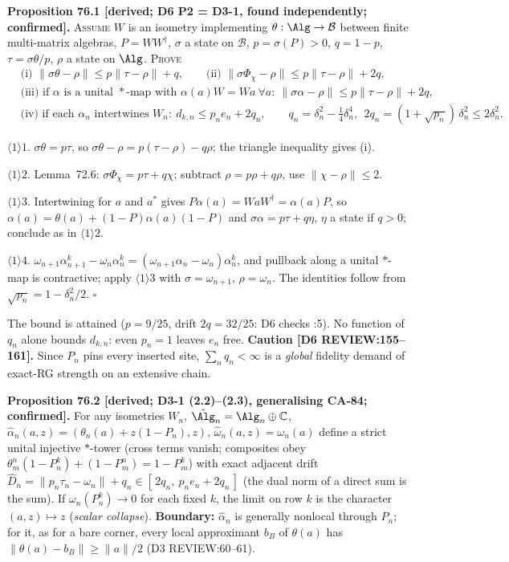 \textbf{Proposition 76.1 [derived; D6 P2 = D3-1, found independently; confirmed].}  \textsc{Assume} \(W\) is an isometry
implementing \(\theta:\Alg\to\mathcal B\) between finite multi-matrix algebras, \(P=WW^\dagger\), \(\sigma\) a state on
\(\mathcal B\), \(p=\sigma(P)>0\), \(q=1-p\), \(\tau=\sigma\theta/p\), \(\rho\) a state on \(\Alg\).  \textsc{Prove}
\begin{align*}
 &\text{(i) } \|\sigma\theta-\rho\|\le p\|\tau-\rho\|+q, \qquad
  \text{(ii) } \|\sigma\Phi_\chi-\rho\|\le p\|\tau-\rho\|+2q,\\
 &\text{(iii) if } \alpha \text{ is a unital } *\text{-map with } \alpha(a)W=Wa\ \forall a:\
  \|\sigma\alpha-\rho\|\le p\|\tau-\rho\|+2q,\\
 &\text{(iv) if each } \alpha_n \text{ intertwines } W_n:\ d_{k,n}\le p_ne_n+2q_n,\qquad
  q_n=\delta_n^2-\tfrac14\delta_n^4,\ \ 2q_n=(1+\sqrt{p_n})\,\delta_n^2\le2\delta_n^2 .
\end{align*}
\par\(\langle1\rangle1\). \(\sigma\theta=p\tau\), so \(\sigma\theta-\rho=p(\tau-\rho)-q\rho\); the triangle inequality gives (i).
\par\(\langle1\rangle2\). Lemma~72.6: \(\sigma\Phi_\chi=p\tau+q\chi\); subtract \(\rho=p\rho+q\rho\), use \(\|\chi-\rho\|\le2\).
\par\(\langle1\rangle3\). Intertwining for \(a\) and \(a^*\) gives \(P\alpha(a)=WaW^\dagger=\alpha(a)P\), so
\(\alpha(a)=\theta(a)+(1-P)\alpha(a)(1-P)\) and \(\sigma\alpha=p\tau+q\eta\), \(\eta\) a state if \(q>0\); conclude as in
\(\langle1\rangle2\).
\par\(\langle1\rangle4\). \(\omega_{n+1}\alpha^k_{n+1}-\omega_n\alpha^k_n=(\omega_{n+1}\alpha_n-\omega_n)\alpha^k_n\), and
pullback along a unital \(*\)-map is contractive; apply \(\langle1\rangle3\) with \(\sigma=\omega_{n+1}\),
\(\rho=\omega_n\).  The identities follow from \(\sqrt{p_n}=1-\delta_n^2/2\).  \(\square\)

The bound is attained (\(p=9/25\), drift \(2q=32/25\): D6 checks :5).  No function of \(q_n\)
alone bounds \(d_{k,n}\): even \(p_n=1\) leaves \(e_n\) free.  \textbf{Caution [D6 REVIEW:155--161].}  Since \(P_n\) pins
every inserted site, \(\sum_nq_n<\infty\) is a \emph{global} fidelity demand of exact-RG strength on an extensive chain.

\textbf{Proposition 76.2 [derived; D3-1 (2.2)--(2.3), generalising CA-84; confirmed].}  For any isometries \(W_n\),
\(\hat\Alg_n=\Alg_n\oplus\mathbb C\), \(\hat\alpha_n(a,z)=(\theta_n(a)+z(1-P_n),z)\), \(\hat\omega_n(a,z)=\omega_n(a)\)
define a strict unital injective \(*\)-tower (cross terms vanish; composites obey
\(\theta^n_m(1-P^k_n)+(1-P^n_m)=1-P^k_m\)) with exact adjacent drift
\(\hat D_n=\|p_n\tau_n-\omega_n\|+q_n\in[\,2q_n,\ p_ne_n+2q_n\,]\) (the dual norm of a direct sum is the sum).  If
\(\omega_n(P^k_n)\to0\) for each fixed \(k\), the limit on row \(k\) is the character \((a,z)\mapsto z\) (\emph{scalar
collapse}).  \textbf{Boundary:} \(\hat\alpha_n\) is generally nonlocal through \(P_n\); for it, as for a bare corner,
every local approximant \(b_B\) of \(\theta(a)\) has \(\|\theta(a)-b_B\|\ge\|a\|/2\) (D3 REVIEW:60--61).

